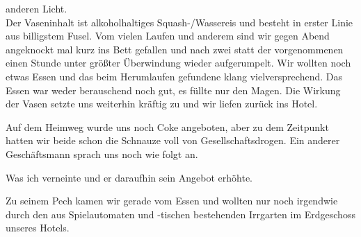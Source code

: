 \vspace*{1cm}

anderen Licht.\\

Der Vaseninhalt ist alkoholhaltiges Squash-/Wassereis und besteht in erster Linie aus billigstem Fusel.
Vom vielen Laufen und anderem sind wir gegen Abend angeknockt mal kurz ins Bett gefallen und nach zwei statt der vorgenommenen einen Stunde unter größter Überwindung wieder aufgerumpelt.
Wir wollten noch etwas Essen und das beim Herumlaufen gefundene  klang vielversprechend.
Das Essen war weder berauschend noch gut, es füllte nur den Magen.
Die Wirkung der Vasen setzte uns weiterhin kräftig zu und wir liefen zurück ins Hotel.

Auf dem Heimweg wurde uns noch Coke angeboten, aber zu dem Zeitpunkt hatten wir beide schon die Schnauze voll von Gesellschaftsdrogen.
Ein anderer Geschäftsmann sprach uns noch wie folgt an.
\begin{quote}
\end{quote}
Was ich verneinte und er daraufhin sein Angebot erhöhte.
\begin{quote}
\end{quote}
Zu seinem Pech kamen wir gerade vom Essen und wollten nur noch irgendwie durch den aus Spielautomaten und -tischen bestehenden Irrgarten im Erdgeschoss unseres Hotels.
